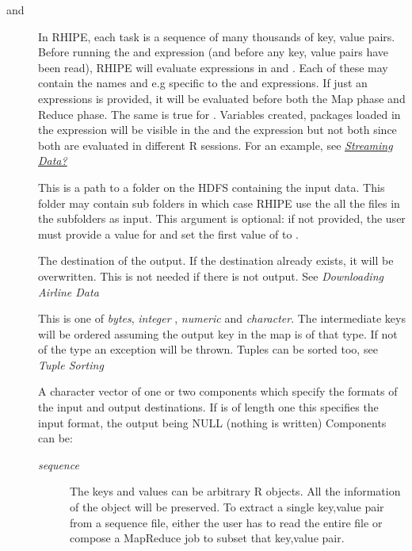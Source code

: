 \documentclass[letterpaper,10pt,english]{sphinxmanual}
\begin{document}
\begin{description}
\item[{ and }] \leavevmode
In RHIPE, each task is a sequence of many thousands of
key, value pairs. Before running the  and  expression
(and before any key, value pairs have been read),
RHIPE will evaluate expressions in  and . Each of
these may contain the names  and  e.g
 specific to the  and 
expressions. If just an expressions is provided, it will be evaluated before
both the Map phase and Reduce phase. The same is true for
. Variables created, packages loaded in the  expression
will be visible in the  and the  expression but not both since
both are evaluated in different R sessions. For an example, see {\hyperref[airline:streaming-data]{\emph{Streaming Data?}}}

\item[{}] \leavevmode
This is a path to a folder on the HDFS containing the input
data. This folder may contain sub folders in which case RHIPE use the all the
files in the subfolders as input. This argument is optional: if not provided,
the user must provide a value for  and set the first value of
 to .

\item[{}] \leavevmode
The destination of the output. If the destination already exists,
it will be overwritten. This is not needed if there is not output. See \emph{Downloading Airline Data}

\item[{}] \leavevmode
This is one of \emph{bytes}, \emph{integer} ,  \emph{numeric} and \emph{character}. The intermediate keys will be ordered assuming the
output key in the map is of that type. If not of the type an exception will be thrown. Tuples can be sorted too, see \emph{Tuple Sorting}

\item[{}] \leavevmode
A character vector of one or two components which specify the formats of
the input and output destinations. If  is of length one this specifies the input format, the output being NULL (nothing is written)
Components can be:
\begin{description}
\item[{\emph{sequence}}] \leavevmode
The keys and values can be arbitrary R objects. All the
information of the object will be preserved. To extract a single key,value
pair from a sequence file, either the user has to read the entire file or
compose a MapReduce job to subset that key,value pair.


\end{description}
\end{description}
\end{document}

